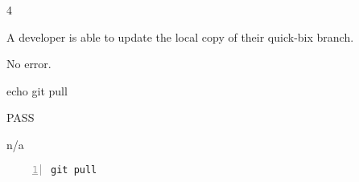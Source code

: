 \begin{description}[align=right,leftmargin=3.2cm,labelindent=3.0cm]
\item[Step:] 4
\item[Confirm:] A developer is able to update the local copy of their quick-bix branch.
\item[Expectation:] No error.
\item[Command:] echo git  pull
\item[Test Result:] PASS
\item[Evidence:] n/a
\end{description}
\begin{lstlisting}[numbers=left]
git pull

\end{lstlisting}
